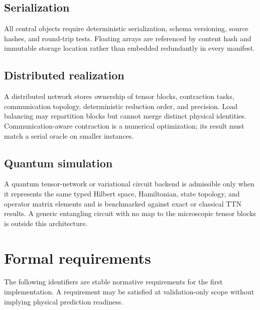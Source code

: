 \documentclass[11pt]{article}
\begin{document}
\subsection{Serialization}

All central objects require deterministic serialization, schema versioning,
source hashes, and round-trip tests.  Floating arrays are referenced by content
hash and immutable storage location rather than embedded redundantly in every
manifest.

\subsection{Distributed realization}

A distributed network stores ownership of tensor blocks, contraction tasks,
communication topology, deterministic reduction order, and precision.  Load
balancing may repartition blocks but cannot merge distinct physical identities.
Communication-aware contraction is a numerical optimization; its result must
match a serial oracle on smaller instances.

\subsection{Quantum simulation}

A quantum tensor-network or variational circuit backend is admissible only when
it represents the same typed Hilbert space, Hamiltonian, state topology, and
operator matrix elements and is benchmarked against exact or classical TTN
results.  A generic entangling circuit with no map to the microscopic tensor
blocks is outside this architecture.

\section{Formal requirements}
\label{sec:requirements}

The following identifiers are stable normative requirements for the first
implementation.  A requirement may be satisfied at validation-only scope
without implying physical prediction readiness.
\end{document}
